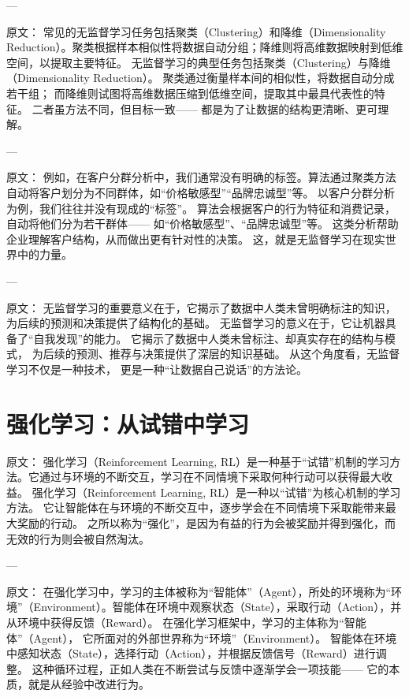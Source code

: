 ---

原文：
常见的无监督学习任务包括聚类（Clustering）和降维（Dimensionality Reduction）。聚类根据样本相似性将数据自动分组；降维则将高维数据映射到低维空间，以提取主要特征。
无监督学习的典型任务包括聚类（Clustering）与降维（Dimensionality Reduction）。  
聚类通过衡量样本间的相似性，将数据自动分成若干组；  
而降维则试图将高维数据压缩到低维空间，提取其中最具代表性的特征。  
二者虽方法不同，但目标一致——  
都是为了让数据的结构更清晰、更可理解。

---

原文：
例如，在客户分群分析中，我们通常没有明确的标签。算法通过聚类方法自动将客户划分为不同群体，如“价格敏感型”“品牌忠诚型”等。
以客户分群分析为例，我们往往并没有现成的“标签”。  
算法会根据客户的行为特征和消费记录，自动将他们分为若干群体——  
如“价格敏感型”、“品牌忠诚型”等。  
这类分析帮助企业理解客户结构，从而做出更有针对性的决策。  
这，就是无监督学习在现实世界中的力量。

---

原文：
无监督学习的重要意义在于，它揭示了数据中人类未曾明确标注的知识，为后续的预测和决策提供了结构化的基础。
无监督学习的意义在于，它让机器具备了“自我发现”的能力。  
它揭示了数据中人类未曾标注、却真实存在的结构与模式，  
为后续的预测、推荐与决策提供了深层的知识基础。  
从这个角度看，无监督学习不仅是一种技术，  
更是一种“让数据自己说话”的方法论。

\section{强化学习：从试错中学习}

原文：
强化学习（Reinforcement Learning, RL）是一种基于“试错”机制的学习方法。它通过与环境的不断交互，学习在不同情境下采取何种行动可以获得最大收益。
强化学习（Reinforcement Learning, RL）是一种以“试错”为核心机制的学习方法。  
它让智能体在与环境的不断交互中，逐步学会在不同情境下采取能带来最大奖励的行动。  
之所以称为“强化”，是因为有益的行为会被奖励并得到强化，而无效的行为则会被自然淘汰。

---

原文：
在强化学习中，学习的主体被称为“智能体”（Agent），所处的环境称为“环境”（Environment）。智能体在环境中观察状态（State），采取行动（Action），并从环境中获得反馈（Reward）。
在强化学习框架中，学习的主体称为“智能体”（Agent），  
它所面对的外部世界称为“环境”（Environment）。  
智能体在环境中感知状态（State），选择行动（Action），并根据反馈信号（Reward）进行调整。  
这种循环过程，正如人类在不断尝试与反馈中逐渐学会一项技能——  
它的本质，就是从经验中改进行为。

